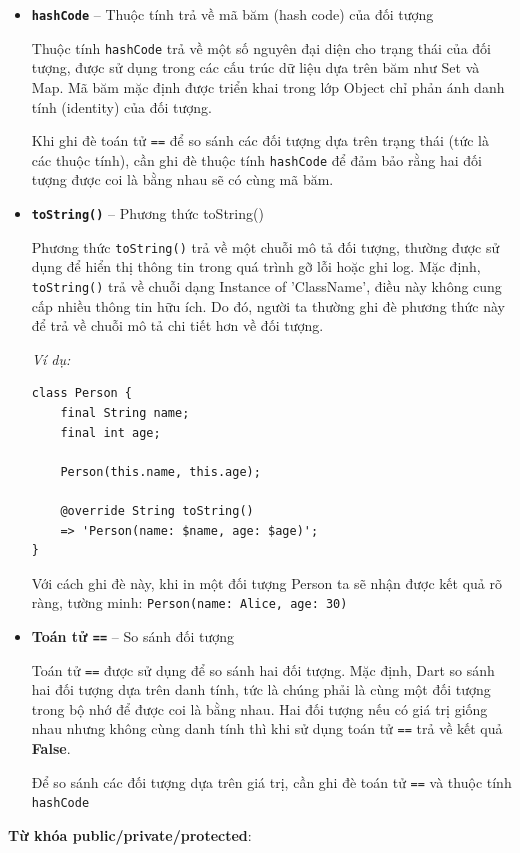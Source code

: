 \documentclass[../DoAn.tex]{subfiles}
\numberwithin{figure}{chapter}
\begin{document}
\begin{itemize} 
\item \textbf{\texttt{hashCode}} – Thuộc tính trả về mã băm (hash code) của đối tượng 

Thuộc tính \texttt{hashCode} trả về một số nguyên đại diện cho trạng thái của đối tượng, được sử dụng trong các cấu trúc dữ liệu dựa trên băm như Set và Map. Mã băm mặc định được triển khai trong lớp Object chỉ phản ánh danh tính (identity) của đối tượng. 

Khi ghi đè toán tử \texttt{==} để so sánh các đối tượng dựa trên trạng thái (tức là các thuộc tính), cần ghi đè thuộc tính \texttt{hashCode} để đảm bảo rằng hai đối tượng được coi là bằng nhau sẽ có cùng mã băm. 

\item \textbf{\texttt{toString()}} – Phương thức toString() 

Phương thức \texttt{toString()} trả về một chuỗi mô tả đối tượng, thường được sử dụng để hiển thị thông tin trong quá trình gỡ lỗi hoặc ghi log. Mặc định, \texttt{toString()} trả về chuỗi dạng Instance of 'ClassName', điều này không cung cấp nhiều thông tin hữu ích. Do đó, người ta thường ghi đè phương thức này để trả về chuỗi mô tả chi tiết hơn về đối tượng. 

\textit{Ví dụ:}
\begin{lstlisting}
class Person { 
    final String name; 
    final int age;
    
    Person(this.name, this.age);
    
    @override String toString() 
    => 'Person(name: $name, age: $age)'; 
} 
\end{lstlisting}
Với cách ghi đè này, khi in một đối tượng Person ta sẽ nhận được kết quả rõ ràng, tường minh: 
    \texttt{Person(name: Alice, age: 30)}
\item \textbf{Toán tử \texttt{==}} – So sánh đối tượng 

Toán tử \texttt{==} được sử dụng để so sánh hai đối tượng. Mặc định, Dart so sánh hai đối tượng dựa trên danh tính, tức là chúng phải là cùng một đối tượng trong bộ nhớ để được coi là bằng nhau. Hai đối tượng nếu có giá trị giống nhau nhưng không cùng danh tính thì khi sử dụng toán tử \texttt{==} trả về kết quả \textbf{False}. 

Để so sánh các đối tượng dựa trên giá trị, cần ghi đè toán tử \texttt{==} và thuộc tính \texttt{hashCode}
\end{itemize}

\textbf{Từ khóa public/private/protected}: 
\end{document}
